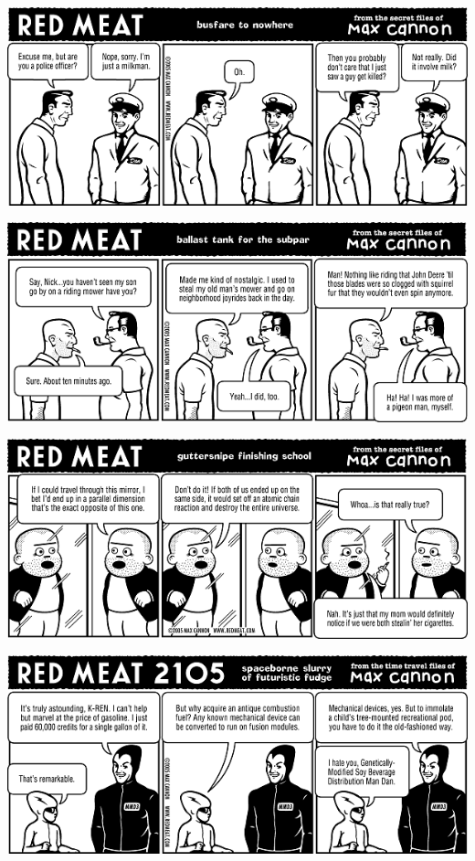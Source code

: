 \documentclass[a4paper,twoside,11pt]{article}
\begin{document}
\includegraphics[width=\textwidth]{redmeat_2005-04-12.png}



\includegraphics[width=\textwidth]{redmeat_2005-04-19.png}



\includegraphics[width=\textwidth]{redmeat_2005-04-26.png}



\includegraphics[width=\textwidth]{redmeat_2005-05-03.png}
\end{document}
